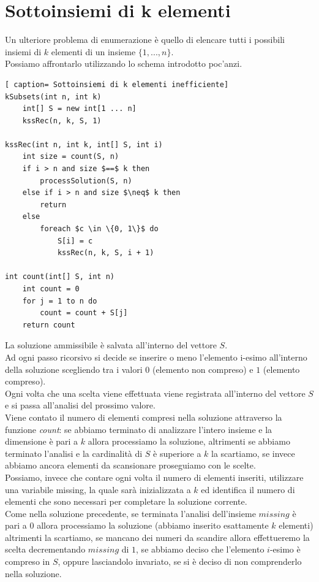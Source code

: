 \documentclass[../cheatSheetAlgoritmi.tex]{subfiles}
\begin{document}
\section{Sottoinsiemi di k elementi}
Un ulteriore problema di enumerazione è quello di elencare tutti i possibili insiemi di $k$ elementi di un insieme $\{1, ..., n\}$. \\
Possiamo affrontarlo utilizzando lo schema introdotto poc'anzi.
 \begin{lstlisting}[ caption= Sottoinsiemi di k elementi inefficiente]
kSubsets(int n, int k)
	int[] S = new int[1 ... n]
	kssRec(n, k, S, 1)

kssRec(int n, int k, int[] S, int i)
	int size = count(S, n)
	if i > n and size $==$ k then
		processSolution(S, n)
	else if i > n and size $\neq$ k then
		return 
	else
		foreach $c \in \{0, 1\}$ do
			S[i] = c
			kssRec(n, k, S, i + 1)
			
int count(int[] S, int n)
	int count = 0
	for j = 1 to n do
		count = count + S[j]
	return count
\end{lstlisting}
La soluzione ammissibile è salvata all'interno del vettore $S$. \\
Ad ogni passo ricorsivo si decide se inserire o meno l'elemento i-esimo all'interno della soluzione scegliendo tra i valori $0$ (elemento non compreso) e $1$ (elemento compreso).  \\
Ogni volta che una scelta viene effettuata viene registrata all'interno del vettore $S$ e si passa all'analisi del prossimo valore. \\
Viene contato il numero di elementi compresi nella soluzione attraverso la funzione \emph{count}: se abbiamo terminato di analizzare l'intero insieme e la dimensione è pari a $k$ allora processiamo la soluzione, altrimenti se abbiamo terminato l'analisi e la cardinalità di $S$ è superiore a $k$ la scartiamo, se invece abbiamo ancora elementi da scansionare proseguiamo con le scelte. \\
Possiamo, invece che contare ogni volta il numero di elementi inseriti, utilizzare una variabile missing, la quale sarà inizializzata a $k$ ed identifica il numero di elementi che sono necessari per completare la soluzione corrente. \\ 
Come nella soluzione precedente, se terminata l'analisi dell'insieme $missing$ è pari a $0$ allora processiamo la soluzione (abbiamo inserito esattamente $k$ elementi) altrimenti la scartiamo, se mancano dei numeri da scandire allora effettueremo la scelta decrementando $missing$ di $1$, se abbiamo deciso che l'elemento $i$-esimo è compreso in $S$, oppure lasciandolo invariato, se si è deciso di non comprenderlo nella soluzione. 
 
\end{document}
